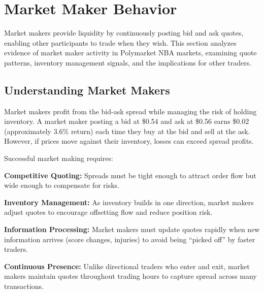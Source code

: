 
\chapter{Market Maker Behavior}
\label{sec:market-makers}

Market makers provide liquidity by continuously posting bid and ask quotes, enabling other participants to trade when they wish. This section analyzes evidence of market maker activity in Polymarket NBA markets, examining quote patterns, inventory management signals, and the implications for other traders.

\section{Understanding Market Makers}

Market makers profit from the bid-ask spread while managing the risk of holding inventory. A market maker posting a bid at \$0.54 and ask at \$0.56 earns \$0.02 (approximately 3.6\% return) each time they buy at the bid and sell at the ask. However, if prices move against their inventory, losses can exceed spread profits.

Successful market making requires:

\textbf{Competitive Quoting:} Spreads must be tight enough to attract order flow but wide enough to compensate for risks.

\textbf{Inventory Management:} As inventory builds in one direction, market makers adjust quotes to encourage offsetting flow and reduce position risk.

\textbf{Information Processing:} Market makers must update quotes rapidly when new information arrives (score changes, injuries) to avoid being ``picked off'' by faster traders.

\textbf{Continuous Presence:} Unlike directional traders who enter and exit, market makers maintain quotes throughout trading hours to capture spread across many transactions.

